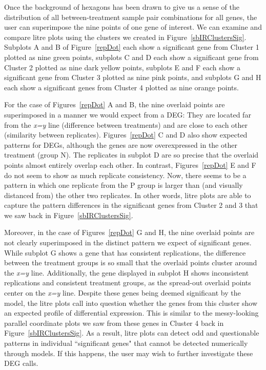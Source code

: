 \documentclass{bmcart}
\begin{document}
\begin{linenumbers}
\begin{doublespacing}
Once the background of hexagons has been drawn to give us a sense of the distribution of all between-treatment sample pair combinations for all genes, the user can superimpose the nine points of one gene of interest. We can examine and compare litre plots using the clusters we created in Figure~\ref{sbIRClustersSig}. Subplots A and B of Figure~\ref{repDot} each show a significant gene from Cluster 1 plotted as nine green points, subplots C and D each show a significant gene from Cluster 2 plotted as nine dark yellow points, subplots E and F each show a significant gene from Cluster 3 plotted as nine pink points, and subplots G and H each show a significant genes from Cluster 4 plotted as nine orange points.

For the case of Figures~\ref{repDot} A and B, the nine overlaid points are superimposed in a manner we would expect from a DEG: They are located far from the \textit{x=y} line (difference between treatments) and are close to each other (similarity between replicates). Figures~\ref{repDot} C and D also show expected patterns for DEGs, although the genes are now overexpressed in the other treatment (group N). The replicates in subplot D are so precise that the overlaid points almost entirely overlap each other. In contrast, Figures~\ref{repDot} E and F do not seem to show as much replicate consistency. Now, there seems to be a pattern in which one replicate from the P group is larger than (and visually distanced from) the other two replicates. In other words, litre plots are able to capture the pattern differences in the significant genes from Cluster 2 and 3 that we saw back in Figure~\ref{sbIRClustersSig}.

Moreover, in the case of Figures~\ref{repDot} G and H, the nine overlaid points are not clearly superimposed in the distinct pattern we expect of significant genes. While subplot G shows a gene that has consistent replications, the difference between the treatment groups is so small that the overlaid points cluster around the \textit{x=y} line. Additionally, the gene displayed in subplot H shows inconsistent replications and consistent treatment groups, as the spread-out overlaid points center on the \textit{x=y} line. Despite these genes being deemed significant by the model, the litre plots call into question whether the genes from this cluster show an expected profile of differential expression. This is similar to the messy-looking parallel coordinate plots we saw from these genes in Cluster 4 back in Figure~\ref{sbIRClustersSig}. As a result, litre plots can detect odd and questionable patterns in individual ``significant genes" that cannot be detected numerically through models. If this happens, the user may wish to further investigate these DEG calls.


\end{doublespacing}
\end{linenumbers}
\end{document}

